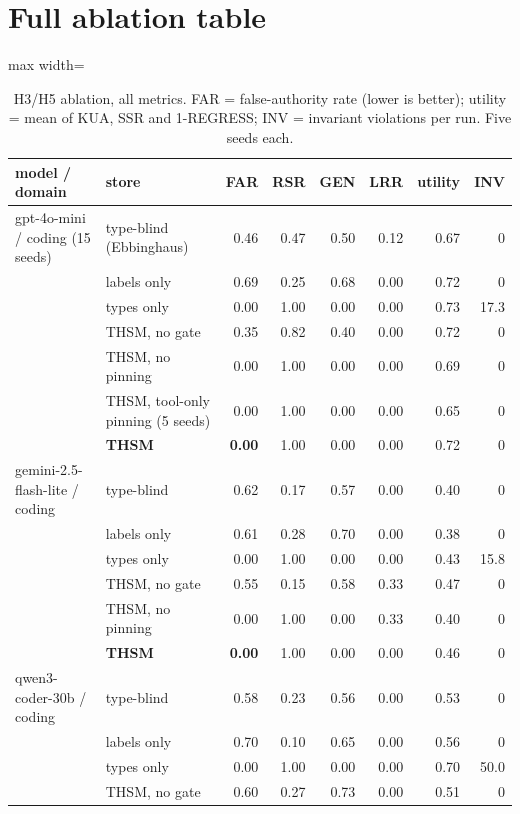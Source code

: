 \clearpage
\section{Full ablation table}
\label{sec:full-ablation-table}

\setcounter{table}{0}
\renewcommand{\thetable}{C\arabic{table}}
\begin{table}[!ht]
\centering
\footnotesize
\caption{H3/H5 ablation, all metrics. FAR = false-authority rate (lower is better); utility = mean of KUA, SSR and 1-REGRESS; INV = invariant violations per run. Five seeds each.}
\label{tab:C1}
\begin{adjustbox}{max width=\linewidth}
\begin{tabular}{llrrrrrr}
\toprule
model / domain & store & FAR & RSR & GEN & LRR & utility & INV \\
\midrule
gpt-4o-mini / coding (15 seeds) & type-blind (Ebbinghaus) & 0.46 & 0.47 & 0.50 & 0.12 & 0.67 & 0 \\
 & labels only & 0.69 & 0.25 & 0.68 & 0.00 & 0.72 & 0 \\
 & types only & 0.00 & 1.00 & 0.00 & 0.00 & 0.73 & 17.3 \\
 & THSM, no gate & 0.35 & 0.82 & 0.40 & 0.00 & 0.72 & 0 \\
 & THSM, no pinning & 0.00 & 1.00 & 0.00 & 0.00 & 0.69 & 0 \\
 & THSM, tool-only pinning (5 seeds) & 0.00 & 1.00 & 0.00 & 0.00 & 0.65 & 0 \\
 & \textbf{THSM} & \textbf{0.00} & 1.00 & 0.00 & 0.00 & 0.72 & 0 \\
gemini-2.5-flash-lite / coding & type-blind & 0.62 & 0.17 & 0.57 & 0.00 & 0.40 & 0 \\
 & labels only & 0.61 & 0.28 & 0.70 & 0.00 & 0.38 & 0 \\
 & types only & 0.00 & 1.00 & 0.00 & 0.00 & 0.43 & 15.8 \\
 & THSM, no gate & 0.55 & 0.15 & 0.58 & 0.33 & 0.47 & 0 \\
 & THSM, no pinning & 0.00 & 1.00 & 0.00 & 0.33 & 0.40 & 0 \\
 & \textbf{THSM} & \textbf{0.00} & 1.00 & 0.00 & 0.00 & 0.46 & 0 \\
qwen3-coder-30b / coding & type-blind & 0.58 & 0.23 & 0.56 & 0.00 & 0.53 & 0 \\
 & labels only & 0.70 & 0.10 & 0.65 & 0.00 & 0.56 & 0 \\
 & types only & 0.00 & 1.00 & 0.00 & 0.00 & 0.70 & 50.0 \\
 & THSM, no gate & 0.60 & 0.27 & 0.73 & 0.00 & 0.51 & 0 \\

\end{tabular}
\end{adjustbox}
\end{table}
